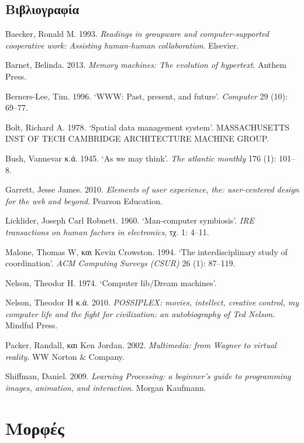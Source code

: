 \documentclass[
]{article}
\newlength{\cslhangindent}
\newlength{\cslentryspacingunit} %
\newenvironment{CSLReferences}[2] %
 {%
  \setlength{\parindent}{0pt}
  \ifodd #1
  \let\oldpar\par
  \def\par{\hangindent=\cslhangindent\oldpar}
  \fi
  \setlength{\parskip}{#2\cslentryspacingunit}
 }%
 {}
\begin{document}
\hypertarget{ux3b2ux3b9ux3b2ux3bbux3b9ux3bfux3b3ux3c1ux3b1ux3c6ux3afux3b1}{%
\subsection*{Βιβλιογραφία}\label{ux3b2ux3b9ux3b2ux3bbux3b9ux3bfux3b3ux3c1ux3b1ux3c6ux3afux3b1}}

\hypertarget{refs}{}
\begin{CSLReferences}{0}{0}
\end{CSLReferences}

Baecker, Ronald M. 1993. \emph{Readings in groupware and
computer-supported cooperative work: Assisting human-human
collaboration}. Elsevier.

Barnet, Belinda. 2013. \emph{Memory machines: The evolution of
hypertext}. Anthem Press.

Berners-Lee, Tim. 1996. {`WWW: Past, present, and future'}.
\emph{Computer} 29 (10): 69--77.

Bolt, Richard A. 1978. {`Spatial data management system'}. MASSACHUSETTS
INST OF TECH CAMBRIDGE ARCHITECTURE MACHINE GROUP.

Bush, Vannevar κ.ά. 1945. {`As we may think'}. \emph{The atlantic
monthly} 176 (1): 101--8.

Garrett, Jesse James. 2010. \emph{Elements of user experience, the:
user-centered design for the web and beyond}. Pearson Education.

Licklider, Joseph Carl Robnett. 1960. {`Man-computer symbiosis'}.
\emph{IRE transactions on human factors in electronics}, τχ. 1: 4--11.

Malone, Thomas W, και Kevin Crowston. 1994. {`The interdisciplinary
study of coordination'}. \emph{ACM Computing Surveys (CSUR)} 26 (1):
87--119.

Nelson, Theodor H. 1974. {`Computer lib/Dream machines'}.

Nelson, Theodor H κ.ά. 2010. \emph{POSSIPLEX: movies, intellect,
creative control, my computer life and the fight for civilization: an
autobiography of Ted Nelson}. Mindful Press.

Packer, Randall, και Ken Jordan. 2002. \emph{Multimedia: from Wagner to
virtual reality}. WW Norton \& Company.

Shiffman, Daniel. 2009. \emph{Learning Processing: a beginner's guide to
programming images, animation, and interaction}. Morgan Kaufmann.

\hypertarget{ux3bcux3bfux3c1ux3c6ux3adux3c2}{%
\section{Μορφές}\label{ux3bcux3bfux3c1ux3c6ux3adux3c2}}
\end{document}
